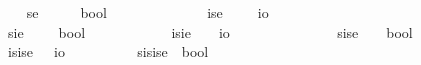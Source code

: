 \begin{isabellebody}
\ \ \isamarkupfalse%
\ se\ {\isacharequal}\ \ \ \ \ {\isachardoublequoteopen}{\isacharparenleft}{\isasymzero}{\isasymRightarrow}bool{\isacharparenright}{\isachardoublequoteclose}\ \ \ \ \ \ \ \ \ \ {\isacharparenleft}{\isachardoublequoteopen}{\isasymlangle}{\isasymzero}{\isasymrangle}{\isachardoublequoteclose}{\isacharparenright}\isanewline
\ \ \isamarkupfalse%
\ ise\ {\isacharequal}\ \ \ \ {\isachardoublequoteopen}{\isacharparenleft}{\isasymzero}{\isasymRightarrow}io{\isacharparenright}{\isachardoublequoteclose}\ \ \ \ \ \ \ \ \ \ \ {\isacharparenleft}{\isachardoublequoteopen}{\isasymup}{\isasymlangle}{\isasymzero}{\isasymrangle}{\isachardoublequoteclose}{\isacharparenright}\isanewline
\ \ \isamarkupfalse%
\ sie\ {\isacharequal}\ \ \ \ {\isachardoublequoteopen}{\isacharparenleft}{\isasymup}{\isasymzero}{\isasymRightarrow}bool{\isacharparenright}{\isachardoublequoteclose}\ \ \ \ \ \ \ \ {\isacharparenleft}{\isachardoublequoteopen}{\isasymlangle}{\isasymup}{\isasymzero}{\isasymrangle}{\isachardoublequoteclose}{\isacharparenright}\isanewline
\ \ \isamarkupfalse%
\ isie\ {\isacharequal}\ \ \ {\isachardoublequoteopen}{\isacharparenleft}{\isasymup}{\isasymzero}{\isasymRightarrow}io{\isacharparenright}{\isachardoublequoteclose}\ \ \ \ \ \ \ \ \ {\isacharparenleft}{\isachardoublequoteopen}{\isasymup}{\isasymlangle}{\isasymup}{\isasymzero}{\isasymrangle}{\isachardoublequoteclose}{\isacharparenright}\ \ \isanewline
\ \ \isamarkupfalse%
\ sise\ {\isacharequal}\ \ \ {\isachardoublequoteopen}{\isacharparenleft}{\isasymup}{\isasymlangle}{\isasymzero}{\isasymrangle}{\isasymRightarrow}bool{\isacharparenright}{\isachardoublequoteclose}\ \ \ \ \ {\isacharparenleft}{\isachardoublequoteopen}{\isasymlangle}{\isasymup}{\isasymlangle}{\isasymzero}{\isasymrangle}{\isasymrangle}{\isachardoublequoteclose}{\isacharparenright}\isanewline
\ \ \isamarkupfalse%
\ isise\ {\isacharequal}\ \ {\isachardoublequoteopen}{\isacharparenleft}{\isasymup}{\isasymlangle}{\isasymzero}{\isasymrangle}{\isasymRightarrow}io{\isacharparenright}{\isachardoublequoteclose}\ \ \ \ \ \ {\isacharparenleft}{\isachardoublequoteopen}{\isasymup}{\isasymlangle}{\isasymup}{\isasymlangle}{\isasymzero}{\isasymrangle}{\isasymrangle}{\isachardoublequoteclose}{\isacharparenright}\isanewline
\ \ \isamarkupfalse%
\ sisise{\isacharequal}\ \ {\isachardoublequoteopen}{\isacharparenleft}{\isasymup}{\isasymlangle}{\isasymup}{\isasymlangle}{\isasymzero}{\isasymrangle}{\isasymrangle}{\isasymRightarrow}bool{\isacharparenright}{\isachardoublequoteclose}\ {\isacharparenleft}{\isachardoublequoteopen}{\isasymlangle}{\isasymup}{\isasymlangle}{\isasymup}{\isasymlangle}{\isasymzero}{\isasymrangle}{\isasymrangle}{\isasymrangle}{\isachardoublequoteclose}{\isacharparenright}\isanewline

\end{isabellebody}
